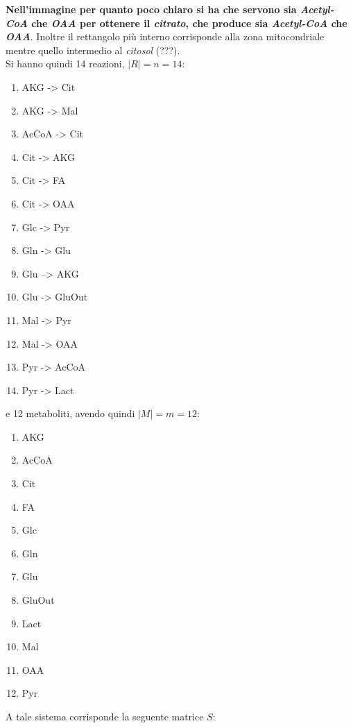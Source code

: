 \documentclass[a4paper,12pt, oneside]{book}
\begin{document}
\textbf{Nell'immagine per quanto poco chiaro si ha che servono sia
  \textit{Acetyl-CoA} che \textit{OAA} per ottenere il
  \textit{citrato}, che produce sia \textit{Acetyl-CoA} che
  \textit{OAA}}. Inoltre il rettangolo più interno corrisponde alla zona 
mitocondriale mentre quello intermedio al \textit{citosol} (???).\\
Si hanno quindi 14 reazioni, $|R|=n=14$:
\begin{multicols}{2}
  \begin{enumerate}
    \item AKG -> Cit
    \item AKG -> Mal
    \item AcCoA -> Cit
    \item Cit -> AKG
    \item Cit -> FA
    \item Cit -> OAA
    \item Glc -> Pyr
    \item Gln -> Glu
    \item Glu –> AKG
    \item Glu -> GluOut
    \item Mal -> Pyr
    \item Mal -> OAA
    \item Pyr -> AcCoA
    \item Pyr -> Lact
  \end{enumerate}
\end{multicols}
e 12 metaboliti, avendo quindi $|M|=m=12$:
\begin{multicols}{4}
  \begin{enumerate}
    \item AKG
    \item {\footnotesize{AcCoA}}
    \item Cit
    \item FA
    \item Glc
    \item Gln
    \item Glu
    \item {\scriptsize{GluOut}}
    \item Lact
    \item Mal
    \item OAA
    \item Pyr
  \end{enumerate}
\end{multicols}
A tale sistema corrisponde la seguente matrice $S$:
\end{document}

